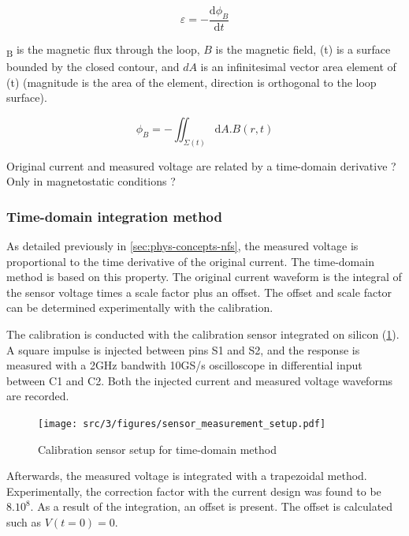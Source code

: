 \begin{equation} \label{eq:faraday}
  \varepsilon = - \frac{\mathrm{d} \phi _{B}}{\mathrm{d} t}
\end{equation}


\textPhi{}\textsubscript{B} is the magnetic flux through the loop, $B$ is the magnetic field, \textSigma{}(t) is a surface bounded by the closed contour,
and $dA$ is an infinitesimal vector area element of \textSigma{}(t) (magnitude is the area of the element, direction is orthogonal to the loop surface).

\begin{equation} \label{eq:phi}
  \phi _{B} = - \iint_{\Sigma(t)} \mathrm{d}A . B(r,t)
\end{equation}

Original current and measured voltage are related by a time-domain derivative ? Only in magnetostatic conditions ?

\subsubsection{Time-domain integration method}

As detailed previously in \ref{sec:phys-concepts-nfs}, the measured voltage is proportional to the time derivative of the original current.
The time-domain method is based on this property.
The original current waveform is the integral of the sensor voltage times a scale factor plus an offset.
The offset and scale factor can be determined experimentally with the calibration.

The calibration is conducted with the calibration sensor integrated on silicon (\ref{fig:calibration-sensor}).
A square impulse is injected between pins S1 and S2, and the response is measured with a 2GHz bandwith 10GS/s oscilloscope in differential input between C1 and C2.
Both the injected current and measured voltage waveforms are recorded.

\begin{figure}[!h]
  \centering
  \texttt{[image: src/3/figures/sensor\_measurement\_setup.pdf]}
  \caption{Calibration sensor setup for time-domain method}
  \label{fig:calibration-sensor}
\end{figure}

Afterwards, the measured voltage is integrated with a trapezoidal method.
Experimentally, the correction factor with the current design was found to be $8.10^8$.
As a result of the integration, an offset is present.
The offset is calculated such as $V(t=0) = 0.$

